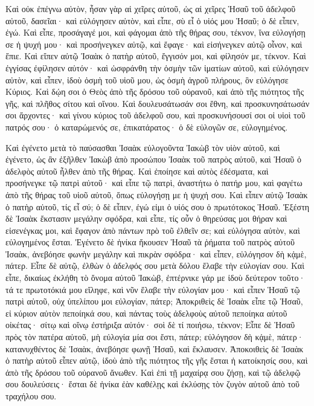{Καὶ οὐκ ἐπέγνω αὐτὸν, ἦσαν γὰρ αἱ χεῖρες αὐτοῦ, ὡς αἱ χεῖρες Ἡσαῦ τοῦ ἀδελφοῦ αὐτοῦ, δασεῖαι· καὶ εὐλόγησεν αὐτὸν,
καὶ εἶπε, σὺ εἶ ὁ υἱός μου Ἡσαῦ; ὁ δὲ εἶπεν, ἐγώ.
Καὶ εἶπε, προσάγαγέ μοι, καὶ φάγομαι ἀπὸ τῆς θήρας σου, τέκνον, ἵνα εὐλογήσῃ σε ἡ ψυχή μου· καὶ προσήνεγκεν αὐτῷ, καὶ ἔφαγε· καὶ εἰσήνεγκεν αὐτῷ οἶνον, καὶ ἔπιε.
Καὶ εἴπεν αὐτῷ Ἰσαὰκ ὁ πατὴρ αὐτοῦ, ἔγγισόν μοι, καὶ φίλησόν με, τέκνον.
Καὶ ἐγγίσας ἐφίλησεν αὐτόν· καὶ ὠσφράνθη τὴν ὀσμὴν τῶν ἱματίων αὐτοῦ, καὶ εὐλόγησεν αὐτὸν, καὶ εἶπεν, ἰδοὺ ὀσμὴ τοῦ υἱοῦ μου, ὡς ὀσμὴ ἀγροῦ πλήρους, ὃν εὐλόγησε Κύριος.
Καὶ δῴη σοι ὁ Θεὸς ἀπὸ τῆς δρόσου τοῦ οὐρανοῦ, καὶ ἀπὸ τῆς πιότητος τῆς γῆς, καὶ πλῆθος σίτου καὶ οἴνου.
Καὶ δουλευσάτωσάν σοι ἔθνη, καὶ προσκυνησάτωσάν σοι ἄρχοντες· καὶ γίνου κύριος τοῦ ἀδελφοῦ σου, καὶ προσκυνήσουσί σοι οἱ υἱοὶ τοῦ πατρός σου· ὁ καταρώμενός σε, ἐπικατάρατος· ὁ δὲ εὐλογῶν σε, εὐλογημένος.
\par }{\PP {}Καὶ ἐγένετο μετὰ τὸ παύσασθαι Ἰσαὰκ εὐλογοῦντα Ἰακὼβ τὸν υἱὸν αὐτοῦ, καὶ ἐγένετο, ὡς ἂν ἐξῆλθεν Ἰακὼβ ἀπὸ προσώπου Ἰσαὰκ τοῦ πατρὸς αὐτοῦ, καὶ Ἡσαῦ ὁ ἀδελφὸς αὐτοῦ ἦλθεν ἀπὸ τῆς θήρας.
Καὶ ἐποίησε καὶ αὐτὸς ἐδέσματα, καὶ προσήνεγκε τῷ πατρὶ αὐτοῦ· καὶ εἶπε τῷ πατρὶ, ἀναστήτω ὁ πατήρ μου, καὶ φαγέτω ἀπὸ τῆς θήρας τοῦ υἱοῦ αὐτοῦ, ὅπως εὐλογήσῃ με ἡ ψυχή σου.
Καὶ εἶπεν αὐτῷ Ἰσαὰκ ὁ πατὴρ αὐτοῦ, τίς εἶ σύ; ὁ δὲ εἶπεν, ἐγώ εἰμι ὁ υἱός σου ὁ πρωτότοκος Ἡσαῦ.
Ἐξέστη δὲ Ἰσαὰκ ἔκστασιν μεγάλην σφόδρα, καὶ εἶπε, τίς οὖν ὁ θηρεύσας μοι θήραν καὶ εἰσενέγκας μοι, καὶ ἔφαγον ἀπὸ πάντων πρὸ τοῦ ἐλθεῖν σε; καὶ εὐλόγησα αὐτὸν, καὶ εὐλογημένος ἔσται.
Ἐγένετο δὲ ἡνίκα ἤκουσεν Ἡσαῦ τὰ ῥήματα τοῦ πατρὸς αὐτοῦ Ἰσαὰκ, ἀνεβόησε φωνὴν μεγάλην καὶ πικρὰν σφόδρα· καὶ εἶπεν, εὐλόγησον δὴ κᾀμὲ, πάτερ.
Εἶπε δὲ αὐτῷ, ἐλθὼν ὁ ἀδελφός σου μετὰ δόλου ἔλαβε τὴν εὐλογίαν σου.
Καὶ εἶπε, δικαίως ἐκλήθη τὸ ὄνομα αὐτοῦ Ἰακὼβ, ἐπτέρνικε γάρ με ἰδοὺ δεύτερον τοῦτο· τά τε πρωτοτόκιά μου εἴληφε, καὶ νῦν ἔλαβε τὴν εὐλογίαν μου· καὶ εἶπεν Ἡσαῦ τῷ πατρὶ αὐτοῦ, οὐχ ὑπελίπου μοι εὐλογίαν, πάτερ;
Ἀποκριθεὶς δὲ Ἰσαὰκ εἶπε τῷ Ἡσαῦ, εἰ κύριον αὐτὸν πεποίηκά σου, καὶ πάντας τοὺς ἀδελφοὺς αὐτοῦ πεποίηκα αὐτοῦ οἰκέτας· σίτῳ καὶ οἴνῳ ἐστήριξα αὐτόν· σοὶ δὲ τί ποιήσω, τέκνον;
Εἶπε δὲ Ἡσαῦ πρὸς τὸν πατέρα αὐτοῦ, μὴ εὐλογία μία σοι ἔστι, πάτερ; εὐλόγησον δὴ κᾀμὲ, πάτερ· κατανυχθέντος δὲ Ἰσαὰκ, ἀνεβόησε φωνῇ Ἡσαῦ, καὶ ἔκλαυσεν.
Ἀποκοιθεὶς δὲ Ἰσαὰκ ὁ πατὴρ αὐτοῦ εἶπεν αὐτῷ, ἰδοὺ ἀπὸ τῆς πιότητος τῆς γῆς ἔσται ἡ κατοίκησίς σου, καὶ ἀπὸ τῆς δρόσου τοῦ οὐρανοῦ ἄνωθεν.
Καὶ ἐπὶ τῇ μαχαίρᾳ σου ζήσῃ, καὶ τῷ ἀδελφῷ σου δουλεύσεις· ἔσται δὲ ἡνίκα ἐὰν καθέλῃς καὶ ἐκλύσῃς τὸν ζυγὸν αὐτοῦ ἀπὸ τοῦ τραχήλου σου.
}
